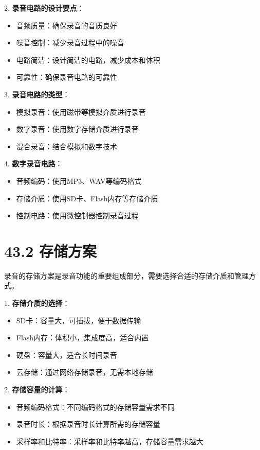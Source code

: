 \documentclass[12pt,UTF8]{ctexbook}
\begin{document}
2. \textbf{录音电路的设计要点}：
   \begin{itemize}[leftmargin=3.5em]
   \item 音频质量：确保录音的音质良好
   \item 噪音控制：减少录音过程中的噪音
   \item 电路简洁：设计简洁的电路，减少成本和体积
   \item 可靠性：确保录音电路的可靠性
   \end{itemize}

3. \textbf{录音电路的类型}：
   \begin{itemize}[leftmargin=3.5em]
   \item 模拟录音：使用磁带等模拟介质进行录音
   \item 数字录音：使用数字存储介质进行录音
   \item 混合录音：结合模拟和数字技术
   \end{itemize}

4. \textbf{数字录音电路}：
   \begin{itemize}[leftmargin=3.5em]
   \item 音频编码：使用MP3、WAV等编码格式
   \item 存储介质：使用SD卡、Flash内存等存储介质
   \item 控制电路：使用微控制器控制录音过程
   \end{itemize}

\section*{43.2 存储方案}

录音的存储方案是录音功能的重要组成部分，需要选择合适的存储介质和管理方式。

1. \textbf{存储介质的选择}：
   \begin{itemize}[leftmargin=3.5em]
   \item SD卡：容量大，可插拔，便于数据传输
   \item Flash内存：体积小，集成度高，适合内置
   \item 硬盘：容量大，适合长时间录音
   \item 云存储：通过网络存储录音，无需本地存储
   \end{itemize}

2. \textbf{存储容量的计算}：
   \begin{itemize}[leftmargin=3.5em]
   \item 音频编码格式：不同编码格式的存储容量需求不同
   \item 录音时长：根据录音时长计算所需的存储容量
   \item 采样率和比特率：采样率和比特率越高，存储容量需求越大
   \end{itemize}
\end{document}
